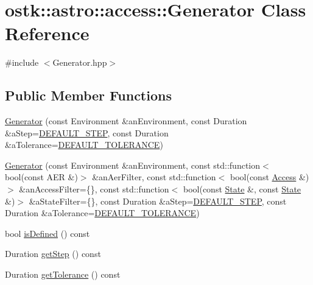 \hypertarget{classostk_1_1astro_1_1access_1_1_generator}{}\section{ostk\+:\+:astro\+:\+:access\+:\+:Generator Class Reference}
\label{classostk_1_1astro_1_1access_1_1_generator}


{\ttfamily \#include $<$Generator.\+hpp$>$}

\subsection*{Public Member Functions}
\begin{DoxyCompactItemize}
\item 
\hyperlink{classostk_1_1astro_1_1access_1_1_generator_a009da655bc3cc6232cd9986275cc5731}{Generator} (const Environment \&an\+Environment, const Duration \&a\+Step=\hyperlink{_generator_8hpp_a7ce1d4cc8c33e65c078f721b17b975ea}{D\+E\+F\+A\+U\+L\+T\+\_\+\+S\+T\+EP}, const Duration \&a\+Tolerance=\hyperlink{_generator_8hpp_a0e355e0dcb761f1b89524e0e77fd14bd}{D\+E\+F\+A\+U\+L\+T\+\_\+\+T\+O\+L\+E\+R\+A\+N\+CE})
\item 
\hyperlink{classostk_1_1astro_1_1access_1_1_generator_a4997c5e017539c2e5a735ed9a152ae8a}{Generator} (const Environment \&an\+Environment, const std\+::function$<$ bool(const A\+ER \&)$>$ \&an\+Aer\+Filter, const std\+::function$<$ bool(const \hyperlink{classostk_1_1astro_1_1_access}{Access} \&)$>$ \&an\+Access\+Filter=\{\}, const std\+::function$<$ bool(const \hyperlink{classostk_1_1astro_1_1trajectory_1_1_state}{State} \&, const \hyperlink{classostk_1_1astro_1_1trajectory_1_1_state}{State} \&)$>$ \&a\+State\+Filter=\{\}, const Duration \&a\+Step=\hyperlink{_generator_8hpp_a7ce1d4cc8c33e65c078f721b17b975ea}{D\+E\+F\+A\+U\+L\+T\+\_\+\+S\+T\+EP}, const Duration \&a\+Tolerance=\hyperlink{_generator_8hpp_a0e355e0dcb761f1b89524e0e77fd14bd}{D\+E\+F\+A\+U\+L\+T\+\_\+\+T\+O\+L\+E\+R\+A\+N\+CE})
\item 
bool \hyperlink{classostk_1_1astro_1_1access_1_1_generator_a36d805bcebc2997daa0a1d89f5240277}{is\+Defined} () const
\item 
Duration \hyperlink{classostk_1_1astro_1_1access_1_1_generator_a1fa5d363b74c6badf4f925174affd91c}{get\+Step} () const
\item 
Duration \hyperlink{classostk_1_1astro_1_1access_1_1_generator_a47010380af2aa5b0ffa9864edb12ff5d}{get\+Tolerance} () const

\end{DoxyCompactItemize}
